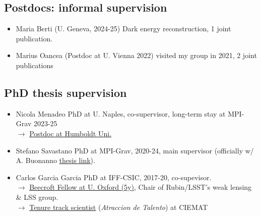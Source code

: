 \documentclass[11pt,a4paper]{article}
\begin{document}
\subsection*{Postdocs: informal supervision} \setlength{\itemsep}{1pt}
\begin{itemize}\setlength{\itemsep}{1pt}
\item {Maria Berti} (U. Geneva, 2024-25) Dark energy reconstruction, {1 joint publication}.
\item {Marius Oancea} (Postdoc at U. Vienna 2022) visited my group in 2021, 2 joint publications
\end{itemize}

\subsection*{PhD thesis supervision}
\begin{itemize}\setlength{\itemsep}{1pt}
 
 \item {Nicola Menadeo} PhD at U. Naples, co-supervisor, long-term stay at MPI-Grav 2023-25 \\ $\longrightarrow$ \underline{Postdoc at Humboldt Uni.}

\item {Stefano Savastano} PhD at MPI-Grav, 2020-24, main supervisor (officially w/ A. Buonanno \href{https://edoc.hu-berlin.de/items/19db3995-f584-401e-b2d3-876b5512106b}{thesis link}). %

\item {Carlos Garcia Garcia} PhD at IFF-CSIC, 2017-20, co-supevisor.  %
 \\ $\longrightarrow$ \underline{Beecroft Fellow at U. Oxford (5y)}, Chair of Rubin/LSST's weak lensing \& LSS group.
 \\ $\longrightarrow$ \underline{Tenure track scientist} (\textit{Atraccion de Talento}) at CIEMAT
 
 \end{itemize}
\end{document}
